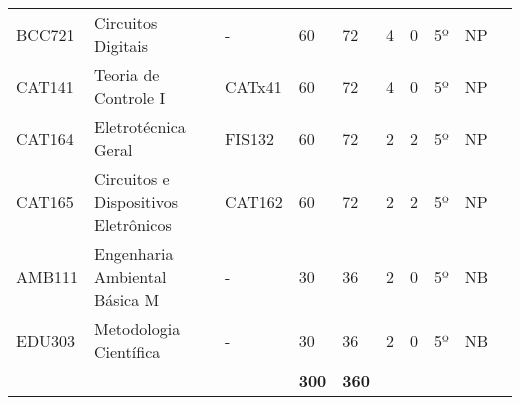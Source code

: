\begin{table}[]
{\begin{tabular}{l|l|l|l|l|l|l|l|l|l}
			\multicolumn{1}{|l|}{BCC721}                        & Circuitos Digitais                                       & -                             & 60                                                           & 72                         & 4                        & 0                         & 5º                         & NP                      &  \\ \cline{1-9}
			\multicolumn{1}{|l|}{CAT141}                        & Teoria de Controle I                                     & CATx41                        & 60                                                           & 72                         & 4                        & 0                         & 5º                         & NP                      &  \\ \cline{1-9}
			\multicolumn{1}{|l|}{CAT164}                        & Eletrotécnica Geral                                      & FIS132                        & 60                                                           & 72                         & 2                        & 2                         & 5º                         & NP                      &  \\ \cline{1-9}
			\multicolumn{1}{|l|}{CAT165}                        & Circuitos e Dispositivos Eletrônicos                     & CAT162                        & 60                                                           & 72                         & 2                        & 2                         & 5º                         & NP                      &  \\ \cline{1-9}
			\multicolumn{1}{|l|}{AMB111}                        & Engenharia Ambiental Básica M                            & -                             & 30                                                           & 36                         & 2                        & 0                         & 5º                         & NB                      &  \\ \cline{1-9}
			\multicolumn{1}{|l|}{EDU303}                        & Metodologia Científica                                   & -                             & 30                                                           & 36                         & 2                        & 0                         & 5º                         & NB                      &  \\ \cline{1-9}
			\multicolumn{1}{|l|}{\textbf{}}                     & \textbf{}                                                & \textbf{}                     & \textbf{300}                                                 & \textbf{360}               & \textbf{}                & \textbf{}                 & \textbf{}                  & \textbf{}               &  \\ \cline{1-9}

\end{tabular}}
\end{table}
